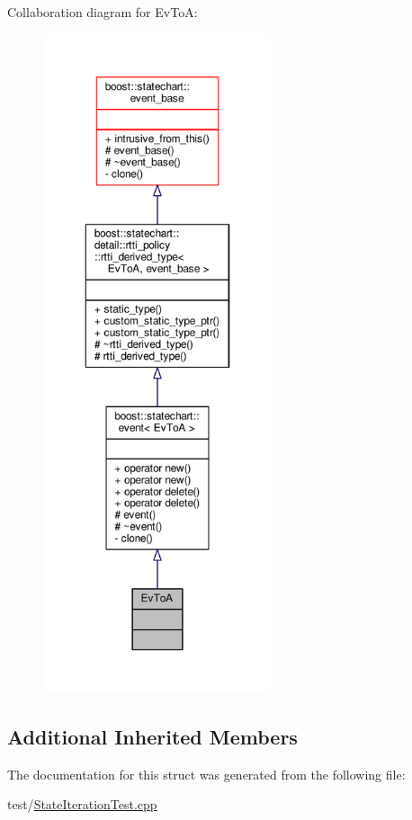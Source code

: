 Collaboration diagram for Ev\+ToA\+:
\nopagebreak
\begin{figure}[H]
\begin{center}
\leavevmode
\includegraphics[height=550pt]{struct_ev_to_a__coll__graph}
\end{center}
\end{figure}
\subsection*{Additional Inherited Members}


The documentation for this struct was generated from the following file\+:\begin{DoxyCompactItemize}
\item 
test/\mbox{\hyperlink{_state_iteration_test_8cpp}{State\+Iteration\+Test.\+cpp}}\end{DoxyCompactItemize}

